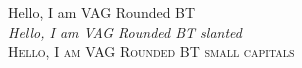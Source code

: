 \documentclass{article}
\begin{document}
\renewcommand{\rmdefault}{bvr}\rmfamily
\noindent Hello, I am VAG Rounded BT\\
{\slshape Hello, I am VAG Rounded BT slanted}\\
{\scshape Hello, I am VAG Rounded BT small capitals}\\
\end{document}
